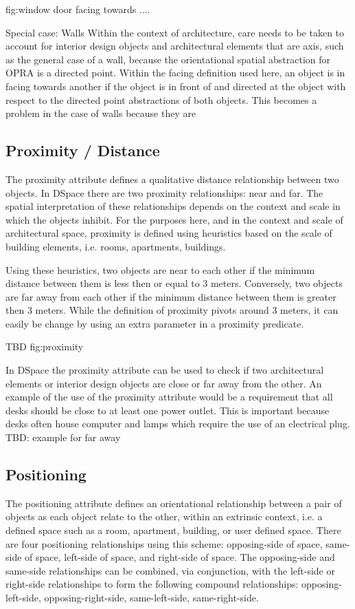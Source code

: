 \documentclass[12pt]{ucthesis}
\begin{document}
fig:window door facing towards ....

Special case: Walls
 Within the context of architecture, care needs to be taken to account for interior design objects and architectural elements that are axis, such as the general   case of a wall, because the orientational spatial abstraction for OPRA is a directed point. Within the facing definition used here, an object is in facing towards another if the object is in front of and directed at the object with respect to the directed point abstractions of both objects. This becomes a problem in the case of walls because they are


\subsection{Proximity / Distance}
The proximity attribute defines a qualitative distance relationship between two objects. In DSpace there are two proximity relationships: near and far. The spatial interpretation of these relationships depends on the context and scale in which the objects inhibit. For the purposes here, and in the context and scale of architectural space, proximity is defined using heuristics based on the scale of building elements, i.e. rooms, apartments, buildings.

Using these heuristics, two objects are near to each other if the minimum distance between them is less then or equal to 3 meters. Conversely, two objects are far away from each other if the minimum distance between them is greater then 3 meters. While the definition of proximity pivots around 3 meters, it can easily be change by using an extra parameter in a proximity predicate. 

TBD fig:proximity
   
In DSpace the proximity attribute can be used to check if two architectural elements or interior design objects are close or far away from the other. An example of the use of the proximity attribute would be a requirement that all desks should be close to at least one power outlet. This is important because desks often house computer and lamps which require the use of an electrical plug. TBD: example for far away



\subsection{Positioning}
The positioning attribute defines an orientational relationship between a pair of objects as each object relate to the other, within an extrinsic context, i.e. a defined space such as a room, apartment, building, or user defined space. There are four positioning relationships using this scheme: opposing-side of space, same-side of space, left-side of space, and right-side of space. The opposing-side and same-side relationships can be combined, via conjunction, with the left-side or right-side relationships to form the following compound relationships: opposing-left-side, opposing-right-side, same-left-side, same-right-side.
\end{document}
